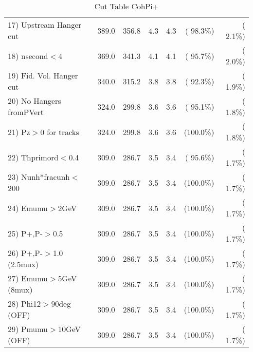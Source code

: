 \begin{table}[h!]
\begin{tabular}{||l||r|r|r|r|r|r||}
 17) Upstream Hanger cut  &        389.0 &        356.8 &          4.3 &          4.3 & ( 98.3\%) & (  2.1\%) \\
 18) nsecond$<$4          &        369.0 &        341.3 &          4.1 &          4.1 & ( 95.7\%) & (  2.0\%) \\
 19) Fid. Vol. Hanger cut &        340.0 &        315.2 &          3.8 &          3.8 & ( 92.3\%) & (  1.9\%) \\
 20) No Hangers fromPVert &        324.0 &        299.8 &          3.6 &          3.6 & ( 95.1\%) & (  1.8\%) \\
 21) Pz$>$0 for tracks    &        324.0 &        299.8 &          3.6 &          3.6 & (100.0\%) & (  1.8\%) \\
 22) Thprimord$<$0.4      &        309.0 &        286.7 &          3.5 &          3.4 & ( 95.6\%) & (  1.7\%) \\
 23) Nunh*fracunh$<$200   &        309.0 &        286.7 &          3.5 &          3.4 & (100.0\%) & (  1.7\%) \\
 24) Emumu$>$2GeV         &        309.0 &        286.7 &          3.5 &          3.4 & (100.0\%) & (  1.7\%) \\
 25) P+,P-$>$0.5          &        309.0 &        286.7 &          3.5 &          3.4 & (100.0\%) & (  1.7\%) \\
 26) P+,P-$>$1.0 (2.5mux) &        309.0 &        286.7 &          3.5 &          3.4 & (100.0\%) & (  1.7\%) \\
 27) Emumu$>$5GeV  (8mux) &        309.0 &        286.7 &          3.5 &          3.4 & (100.0\%) & (  1.7\%) \\
 28) Phi12$>$90deg  (OFF) &        309.0 &        286.7 &          3.5 &          3.4 & (100.0\%) & (  1.7\%) \\
 29) Pmumu$>$10GeV  (OFF) &        309.0 &        286.7 &          3.5 &          3.4 & (100.0\%) & (  1.7\%) \\
 \hline
 \hline
 \end{tabular}
 \caption{Cut Table  CohPi+   }
 \label{tab-cutcohjpsi-mumu_cohpip}
 \end{table}
